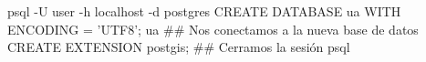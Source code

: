 \lstset{caption=Creación de la base de datos geográfica,label=bash:createDB}
\begin{bash}
psql -U user -h localhost -d postgres
CREATE DATABASE ua WITH ENCODING = 'UTF8';
\connect ua   ## Nos conectamos a la nueva base de datos
CREATE EXTENSION postgis;
\q            ## Cerramos la sesión psql
\end{bash}
